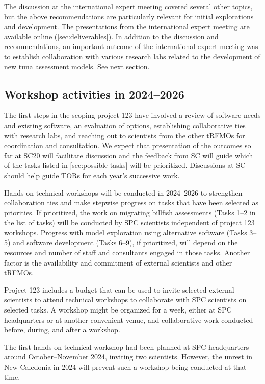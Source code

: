 \documentclass{SCreport}
\begin{document}
\newpage

The discussion at the international expert meeting covered several other topics,
but the above recommendations are particularly relevant for initial explorations
and development. The presentations from the international expert meeting are
available online (\autoref{sec:deliverables}). In addition to the discussion and
recommendations, an important outcome of the international expert meeting was to
establish collaboration with various research labs related to the development of
new tuna assessment models. See next section.

\subsection{Workshop activities in 2024--2026}

The first steps in the scoping project 123 have involved a review of software
needs and existing software, an evaluation of options, establishing
collaborative ties with research labs, and reaching out to scientists from the
other tRFMOs for coordination and consultation. We expect that presentation of
the outcomes so far at SC20 will facilitate discussion and the feedback from SC
will guide which of the tasks listed in \autoref{sec:possible-tasks} will be
prioritized. Discussions at SC should help guide TORs for each year's successive
work.

Hands-on technical workshops will be conducted in 2024--2026 to strengthen
collaboration ties and make stepwise progress on tasks that have been selected
as priorities. If prioritized, the work on migrating billfish assessments (Tasks
1--2 in the list of tasks) will be conducted by SPC scientists independent of
project 123 workshops. Progress with model exploration using alternative
software (Tasks 3--5) and software development (Tasks 6--9), if prioritized,
will depend on the resources and number of staff and consultants engaged in
those tasks. Another factor is the availability and commitment of external
scientists and other tRFMOs.

Project 123 includes a budget that can be used to invite selected external
scientists to attend technical workshops to collaborate with SPC scientists on
selected tasks. A workshop might be organized for a week, either at SPC
headquarters or at another convenient venue, and collaborative work conducted
before, during, and after a workshop.

The first hands-on technical workshop had been planned at SPC headquarters
around October--November 2024, inviting two scientists. However, the unrest in
New Caledonia in 2024 will prevent such a workshop being conducted at that time.
\end{document}
